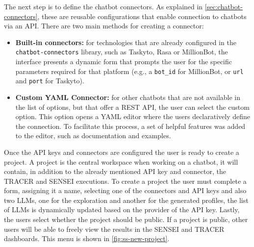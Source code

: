 The next step is to define the chatbot connectors.
As explained in \autoref{sec:chatbot-connectors},
these are reusable configurations
that enable connection to chatbots via an \ac{API}.
There are two main methods for creating a connector:
\begin{itemize}
  \item \textbf{Built-in connectors:}
    for technologies that are already configured
    in the \texttt{chatbot-connectors} library,
    such as Taskyto, Rasa or MillionBot,
    the interface presents a dynamic form
    that prompts the user for the specific parameters
    required for that platform
    (e.g., a \texttt{bot\_id} for MillionBot,
    or \texttt{url} and \texttt{port} for Taskyto).
  \item \textbf{Custom YAML Connector:}
    for other chatbots that are not available in the list of options,
    but that offer a \ac{REST} \ac{API},
    the user can select the custom option.
    This option opens a YAML editor
    where the users declaratively define the connection.
    To facilitate this process, a set of helpful features was added to the editor,
    such as documentation and examples.
\end{itemize}


Once the \ac{API} keys and connectors are configured
the user is ready to create a project.
A project is the central workspace when working on a chatbot,
it will contain, in addition to the already mentioned \ac{API} key and connector,
the \ac{TRACER} and SENSEI executions.
To create a project the user must complete a form,
assigning it a name, selecting one of the connectors and \ac{API} keys
and also two \acp{LLM}, one for the exploration and another for the generated profiles,
the list of \acp{LLM} is dynamically updated based on the provider of the \ac{API} key.
Lastly, the users select whether the project should be public.
If a project is public, other users will be able to freely view the results
in the SENSEI and \ac{TRACER} dashboards.
This menu is shown in \autoref{fig:ss-new-project}.

